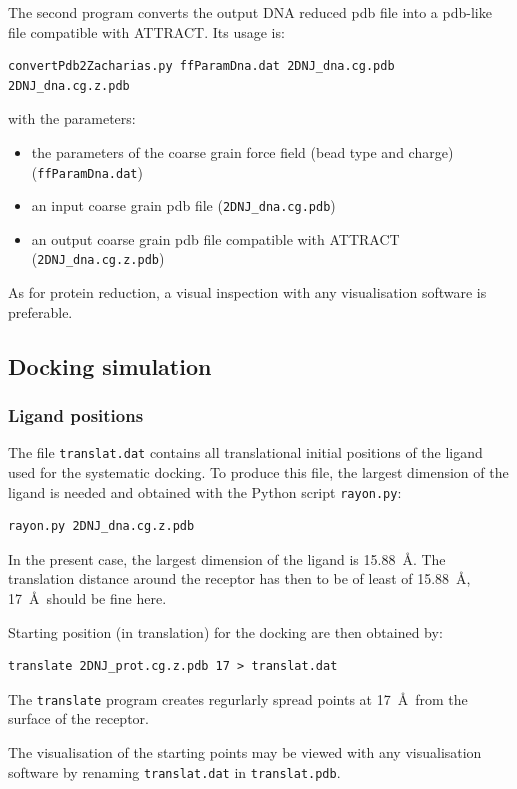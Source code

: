 \documentclass[12pt,a4paper]{article}
\begin{document}
The second program converts the output DNA reduced pdb file into a pdb-like file compatible with ATTRACT. Its usage is:
\begin{verbatim}
convertPdb2Zacharias.py ffParamDna.dat 2DNJ_dna.cg.pdb 2DNJ_dna.cg.z.pdb
\end{verbatim}
with the parameters:
\begin{itemize}
\item the parameters of the coarse grain force field (bead type and charge) ({\tt ffParamDna.dat})
\item an input coarse grain pdb file ({\tt 2DNJ\_dna.cg.pdb})
\item an output coarse grain pdb file compatible with ATTRACT ({\tt 2DNJ\_dna.cg.z.pdb})
\end{itemize}

As for protein reduction, a visual inspection with any visualisation software is preferable.

\subsection{Docking simulation}

\subsubsection{Ligand positions}

The file {\tt translat.dat} contains all translational initial positions of the ligand used for the systematic docking. To produce this file, the largest dimension of the ligand is needed and obtained with the Python script {\tt rayon.py}:
\begin{verbatim}
rayon.py 2DNJ_dna.cg.z.pdb
\end{verbatim} 

In the present case, the largest dimension of the ligand is 15.88~\AA. The translation distance around the receptor has then to be of least of 15.88~\AA, 17~\AA\ should be fine here.

Starting position (in translation) for the docking are then obtained by:
\begin{verbatim}
translate 2DNJ_prot.cg.z.pdb 17 > translat.dat
\end{verbatim}

The {\tt translate} program creates regurlarly spread points at 17~\AA\ from the surface of the receptor.

The visualisation of the starting points may be viewed with any visualisation software by renaming {\tt translat.dat} in {\tt translat.pdb}.
\end{document}
